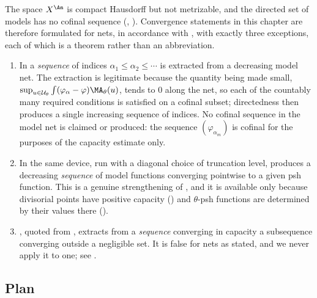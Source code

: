 The space $X^{\An}$ is compact Hausdorff but not metrizable, and the
directed set of models has no cofinal sequence
(,
).  Convergence statements in this chapter
are therefore formulated for nets, in accordance with
, with exactly three exceptions, each of
which is a theorem rather than an abbreviation.

\begin{enumerate}
\item\label{itm:ch25-seq:chebyshev}
 In  a \emph{sequence} of indices
 $\alpha_1\leq\alpha_2\leq\cdots$ is extracted from a decreasing model
 net.  The extraction is legitimate because the quantity being made small,
 $\sup_{u\in\mathcal U_\theta}\int(\varphi_\alpha-\varphi)\MA_\theta(u)$,
 tends to $0$ along the net, so each of the countably many required
 conditions is satisfied on a cofinal subset; directedness then produces a
 single increasing sequence of indices.  No cofinal sequence in the model
 net is claimed or produced: the sequence $(\varphi_{\alpha_m})$ is
 cofinal for the purposes of the capacity estimate only.
\item\label{itm:ch25-seq:diag}
 In  the same device, run with a
 diagonal choice of truncation level, produces a decreasing
 \emph{sequence} of model functions converging pointwise to a given psh
 function.  This is a genuine strengthening of
 , and it is available only because
 divisorial points have positive capacity
 () and $\theta$-psh functions are
 determined by their values there ().
\item\label{itm:ch25-seq:subseq}
 , quoted from
 , extracts from a \emph{sequence} converging
 in capacity a subsequence converging outside a negligible set.  It is
 false for nets as stated, and we never apply it to one; see
 .
\end{enumerate}

\subsection{Plan}
\label{sec:ch25-plan}

